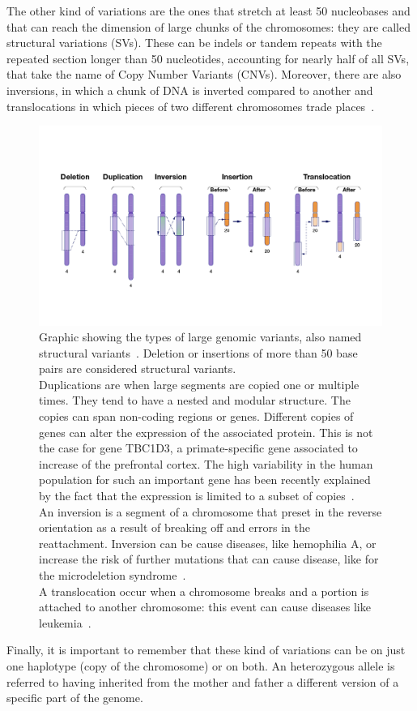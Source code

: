 The other kind of variations are the ones that stretch at least 50 nucleobases and that can reach the dimension of large chunks of the chromosomes: they are called structural variations (SVs).
These can be indels or tandem repeats with the repeated section longer than 50 nucleotides, accounting for nearly half of all SVs, that take the name of Copy Number Variants (CNVs). Moreover, there are also inversions, in which a chunk of DNA is inverted compared to another and translocations in which pieces of two different chromosomes trade places~\cite{nih_variation}.\\
\begin{figure}[!ht]
	\centering
	\includegraphics[width=\linewidth]{figures/background/large_variants.png}
	\caption[Large genomic variants.]{Graphic showing the types of large genomic variants, also named structural variants~\cite{nih_variation}. Deletion or insertions of more than 50 base pairs are considered structural variants.\\ Duplications are when large segments are copied one or multiple times. They tend to have a nested and modular structure. The copies can span non-coding regions or genes. Different copies of genes can alter the expression of the associated protein. This is not the case for gene TBC1D3, a primate-specific gene associated to increase of the prefrontal cortex. The high variability in the human population for such an important gene has been recently explained by the fact that the expression is limited to a subset of copies~\cite{tbc1d3}.\\  An inversion is a segment of a chromosome that preset in the reverse orientation as a result of breaking off and errors in the reattachment. Inversion can be cause diseases, like hemophilia A, or increase the risk of further mutations that can cause disease, like for the microdeletion syndrome~\cite{inversions_disease}.\\ A translocation occur when a chromosome breaks and a portion is attached to another chromosome: this event can cause diseases like leukemia~\cite{leukemia}. }
	\label{fig:large_variants}
\end{figure}
Finally, it is important to remember that these kind of variations can be on just one haplotype (copy of the chromosome) or on both. An heterozygous allele is referred to having inherited from the mother and father a different version of a specific part of the genome.

